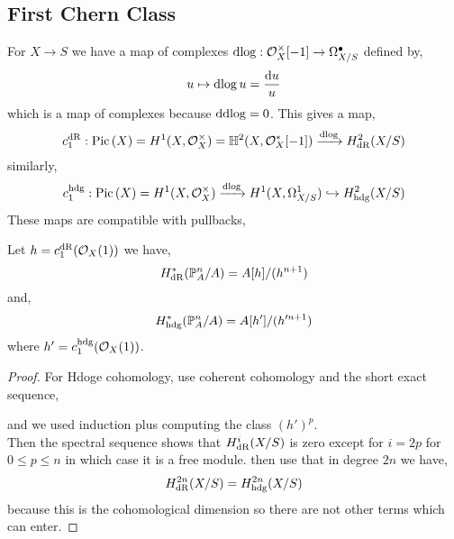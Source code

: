 \documentclass[12pt]{article}
\begin{document}
\subsection{First Chern Class}

\begin{proposition}
For $X \to S$ we have a map of complexes $\d{\log} : \struct{X}^\times[-1] \to \Omega^\bullet_{X /S}$ defined by,
\[ u \mapsto \d{\log{u}} = \frac{\d{u}}{u} \] 
which is a map of complexes because $\d{\d{\log}} = 0$. This gives a map,
\[ c_1^{\dR} : \Pic{X} = H^1(X, \struct{X}^\times) = \mathbb{H}^2(X, \struct{X}^*[-1]) \xrightarrow{\d{\log}} H^2_{\dR}(X / S) \]
similarly,
\[ c_1^{\text{hdg}} : \Pic{X} = H^1(X, \struct{X}^\times) \xrightarrow{\d{\log}} H^1(X, \Omega^1_{X / S}) \embed H^2_{\text{hdg}}(X / S) \]
These maps are compatible with pullbacks,
\begin{center}
\end{center}
\end{proposition}


\begin{proposition}
Let $h = c_1^{\dR}(\struct{X}(1))$ we have,
\[ H^*_{\dR}(\P^n_A / A) = A[h] / (h^{n+1}) \]
and,
\[ H^*_{\text{hdg}}(\P^n_A / A) = A[h']/(h'^{n+1}) \]
where $h' = c_1^{\text{hdg}}(\struct{X}(1))$. 
\end{proposition}

\begin{proof}
For Hdoge cohomology, use coherent cohomology and the short exact sequence,
\begin{center}
\end{center}
and we used induction plus computing the class $(h')^p$.
\bigskip\\
Then the spectral sequence shows that $H^i_{\dR}(X / S)$ is zero except for $i = 2 p$ for $0 \le p \le n$ in which case it is a free module. then use that in degree $2 n$ we have,
\[ H^{2n}_{\dR}(X / S) = H^{2 n}_{\text{hdg}}(X / S) \]
because this is the cohomological dimension so there are not other terms which can enter. 
\end{proof}
\end{document}
